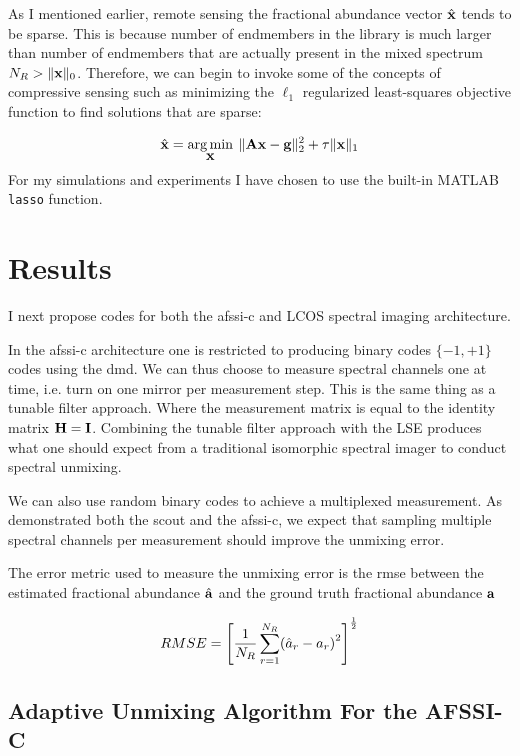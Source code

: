 As I mentioned earlier, remote sensing the fractional abundance vector $\hat{ \displaystyle \mathbf{x} }$ tends to be sparse. This is because number of endmembers in the library is much larger than number of endmembers that are actually present in the mixed spectrum $N_{R} > \| \displaystyle \mathbf{x} \|_0$. Therefore, we can begin to invoke some of the concepts of compressive sensing such as minimizing the $\ell_1$ regularized least-squares objective function to find solutions that are sparse:

%
\begin{equation}
	\hat{ \displaystyle \mathbf{x} } = \operatorname*{arg\,min}_{\displaystyle \mathbf{x}} \: \| \displaystyle \mathbf{Ax} - \displaystyle \mathbf{g} \|_{2}^{2} + \tau \| \displaystyle \mathbf{x} \|_1
	\label{eq:l1reglsV2}
\end{equation}
%
For my simulations and experiments I have chosen to use the built-in MATLAB \texttt{lasso} function. 

\section{Results}

I next propose codes for both the \gls{afssi-c} and LCOS spectral imaging architecture. 

In the \gls{afssi-c} architecture one is restricted to producing binary codes $ \{ -1, +1 \}$ codes using the \gls{dmd}. We can thus choose to measure spectral channels one at time, i.e. turn on one mirror per measurement step. This is the same thing as a tunable filter approach. Where the measurement matrix is equal to the identity matrix $\displaystyle \mathbf{H} = \displaystyle \mathbf{I}$.
Combining the tunable filter approach with the LSE produces what one should expect from a traditional isomorphic spectral imager to conduct spectral unmixing.

We can also use random binary codes to achieve a multiplexed measurement. As demonstrated both the \gls{scout} and the \gls{afssi-c}, we expect that sampling multiple spectral channels per measurement should improve the unmixing error. 

The error metric used to measure the unmixing error is the \acrfull{rmse} between the estimated fractional abundance $\hat{ \displaystyle \mathbf{a} }$ and the ground truth fractional abundance $\displaystyle \mathbf{a}$

\begin{equation}
	RMSE =  \left[ \frac{1}{N_R} \sum_{r = 1}^{N_{R}} \ap{ \hat{a}_r - a_r }^2 \right]^{\frac{1}{2}}
\end{equation}

\subsection{Adaptive Unmixing Algorithm For the AFSSI-C}

